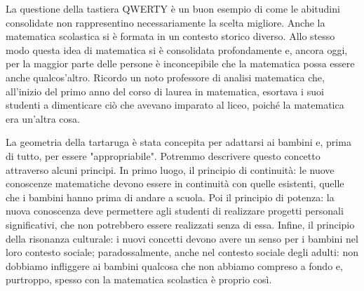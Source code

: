 La questione della tastiera QWERTY è un buon esempio di come le abitudini consolidate non rappresentino necessariamente la scelta migliore. Anche la matematica scolastica si è formata in un contesto storico diverso. Allo stesso modo questa idea di matematica si è consolidata profondamente e, ancora oggi, per la maggior parte delle persone è inconcepibile che la matematica possa essere anche qualcos'altro. Ricordo un noto professore di analisi matematica che, all'inizio del primo anno del corso di laurea in matematica, esortava i suoi studenti a dimenticare ciò che avevano imparato al liceo, poiché la matematica era un'altra cosa. 

La geometria della tartaruga è stata concepita per adattarsi ai bambini e, prima di tutto, per essere "appropriabile". Potremmo descrivere questo concetto attraverso alcuni principi. In primo luogo, il principio di continuità: le nuove conoscenze matematiche devono essere in continuità con quelle esistenti, quelle che i bambini hanno prima di andare a scuola. Poi il principio di potenza: la nuova conoscenza deve permettere agli studenti di realizzare progetti personali significativi, che non potrebbero essere realizzati senza di essa. Infine, il principio della risonanza culturale: i nuovi concetti devono avere un senso per i bambini nel loro contesto sociale; paradossalmente, anche nel contesto sociale degli adulti: non dobbiamo infliggere ai bambini qualcosa che non abbiamo compreso a fondo e, purtroppo, spesso con la matematica scolastica è proprio così. 
